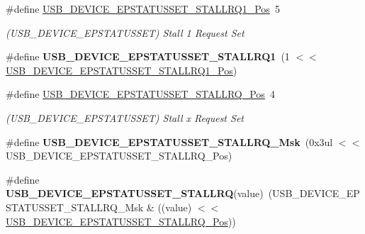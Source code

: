 \begin{DoxyCompactItemize}
\item 
\hypertarget{group___s_a_m_l21___u_s_b_ga0084a281eacd08b532fa862285753a44}{}\#define \hyperlink{group___s_a_m_l21___u_s_b_ga0084a281eacd08b532fa862285753a44}{U\+S\+B\+\_\+\+D\+E\+V\+I\+C\+E\+\_\+\+E\+P\+S\+T\+A\+T\+U\+S\+S\+E\+T\+\_\+\+S\+T\+A\+L\+L\+R\+Q1\+\_\+\+Pos}~5\label{group___s_a_m_l21___u_s_b_ga0084a281eacd08b532fa862285753a44}

\begin{DoxyCompactList}\small\item\em (U\+S\+B\+\_\+\+D\+E\+V\+I\+C\+E\+\_\+\+E\+P\+S\+T\+A\+T\+U\+S\+S\+E\+T) Stall 1 Request Set \end{DoxyCompactList}\item 
\hypertarget{group___s_a_m_l21___u_s_b_ga80d2bc8a994cd99135d4b62c6a2f2c42}{}\#define {\bfseries U\+S\+B\+\_\+\+D\+E\+V\+I\+C\+E\+\_\+\+E\+P\+S\+T\+A\+T\+U\+S\+S\+E\+T\+\_\+\+S\+T\+A\+L\+L\+R\+Q1}~(1 $<$$<$ \hyperlink{group___s_a_m_l21___u_s_b_ga0084a281eacd08b532fa862285753a44}{U\+S\+B\+\_\+\+D\+E\+V\+I\+C\+E\+\_\+\+E\+P\+S\+T\+A\+T\+U\+S\+S\+E\+T\+\_\+\+S\+T\+A\+L\+L\+R\+Q1\+\_\+\+Pos})\label{group___s_a_m_l21___u_s_b_ga80d2bc8a994cd99135d4b62c6a2f2c42}

\item 
\hypertarget{group___s_a_m_l21___u_s_b_ga0282af70f24c564c61a99201844fa35f}{}\#define \hyperlink{group___s_a_m_l21___u_s_b_ga0282af70f24c564c61a99201844fa35f}{U\+S\+B\+\_\+\+D\+E\+V\+I\+C\+E\+\_\+\+E\+P\+S\+T\+A\+T\+U\+S\+S\+E\+T\+\_\+\+S\+T\+A\+L\+L\+R\+Q\+\_\+\+Pos}~4\label{group___s_a_m_l21___u_s_b_ga0282af70f24c564c61a99201844fa35f}

\begin{DoxyCompactList}\small\item\em (U\+S\+B\+\_\+\+D\+E\+V\+I\+C\+E\+\_\+\+E\+P\+S\+T\+A\+T\+U\+S\+S\+E\+T) Stall x Request Set \end{DoxyCompactList}\item 
\hypertarget{group___s_a_m_l21___u_s_b_gaae299d271b8aaf0f30dca30c7b6aca4c}{}\#define {\bfseries U\+S\+B\+\_\+\+D\+E\+V\+I\+C\+E\+\_\+\+E\+P\+S\+T\+A\+T\+U\+S\+S\+E\+T\+\_\+\+S\+T\+A\+L\+L\+R\+Q\+\_\+\+Msk}~(0x3ul $<$$<$ U\+S\+B\+\_\+\+D\+E\+V\+I\+C\+E\+\_\+\+E\+P\+S\+T\+A\+T\+U\+S\+S\+E\+T\+\_\+\+S\+T\+A\+L\+L\+R\+Q\+\_\+\+Pos)\label{group___s_a_m_l21___u_s_b_gaae299d271b8aaf0f30dca30c7b6aca4c}

\item 
\hypertarget{group___s_a_m_l21___u_s_b_ga9b98192a006e789d27bf775a27b996d7}{}\#define {\bfseries U\+S\+B\+\_\+\+D\+E\+V\+I\+C\+E\+\_\+\+E\+P\+S\+T\+A\+T\+U\+S\+S\+E\+T\+\_\+\+S\+T\+A\+L\+L\+R\+Q}(value)~(U\+S\+B\+\_\+\+D\+E\+V\+I\+C\+E\+\_\+\+E\+P\+S\+T\+A\+T\+U\+S\+S\+E\+T\+\_\+\+S\+T\+A\+L\+L\+R\+Q\+\_\+\+Msk \& ((value) $<$$<$ \hyperlink{group___s_a_m_l21___u_s_b_ga0282af70f24c564c61a99201844fa35f}{U\+S\+B\+\_\+\+D\+E\+V\+I\+C\+E\+\_\+\+E\+P\+S\+T\+A\+T\+U\+S\+S\+E\+T\+\_\+\+S\+T\+A\+L\+L\+R\+Q\+\_\+\+Pos}))\label{group___s_a_m_l21___u_s_b_ga9b98192a006e789d27bf775a27b996d7}


\end{DoxyCompactItemize}
